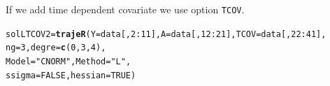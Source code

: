 \documentclass{article}\usepackage[]{graphicx}\usepackage[]{color}
\makeatletter
\newcommand{\hlnum}[1]{\textcolor[rgb]{0.686,0.059,0.569}{#1}}%
\newcommand{\hlstr}[1]{\textcolor[rgb]{0.192,0.494,0.8}{#1}}%
\newcommand{\hlopt}[1]{\textcolor[rgb]{0,0,0}{#1}}%
\newcommand{\hlstd}[1]{\textcolor[rgb]{0.345,0.345,0.345}{#1}}%
\newcommand{\hlkwb}[1]{\textcolor[rgb]{0.69,0.353,0.396}{#1}}%
\newcommand{\hlkwc}[1]{\textcolor[rgb]{0.333,0.667,0.333}{#1}}%
\newcommand{\hlkwd}[1]{\textcolor[rgb]{0.737,0.353,0.396}{\textbf{#1}}}%
\newenvironment{kframe}{%
 \def\at@end@of@kframe{}%
 \ifinner\ifhmode%
  \def\at@end@of@kframe{\end{minipage}}%
  \begin{minipage}{\columnwidth}%
 \fi\fi%
 \def\FrameCommand##1{\hskip\@totalleftmargin \hskip-\fboxsep
 \colorbox{shadecolor}{##1}\hskip-\fboxsep
     \hskip-\linewidth \hskip-\@totalleftmargin \hskip\columnwidth}%
 \MakeFramed {\advance\hsize-\width
   \@totalleftmargin\z@ \linewidth\hsize
   \@setminipage}}%
 {\par\unskip\endMakeFramed%
 \at@end@of@kframe}
\newenvironment{knitrout}{}{} %
\makeatother
\begin{document}
If we add time dependent covariate we use option \verb|TCOV|.
\begin{knitrout}
\color{fgcolor}\begin{kframe}
\begin{alltt}
\hlstd{solLTCOV2} \hlkwb{=} \hlkwd{trajeR}\hlstd{(}\hlkwc{Y} \hlstd{= data[,}\hlnum{2}\hlopt{:}\hlnum{11}\hlstd{],} \hlkwc{A} \hlstd{= data[,}\hlnum{12}\hlopt{:}\hlnum{21}\hlstd{],} \hlkwc{TCOV} \hlstd{= data[,}\hlnum{22}\hlopt{:}\hlnum{41}\hlstd{],}
                   \hlkwc{ng} \hlstd{=} \hlnum{3}\hlstd{,} \hlkwc{degre} \hlstd{=} \hlkwd{c}\hlstd{(}\hlnum{0}\hlstd{,}\hlnum{3}\hlstd{,}\hlnum{4}\hlstd{),}
                   \hlkwc{Model} \hlstd{=} \hlstr{"CNORM"}\hlstd{,} \hlkwc{Method} \hlstd{=} \hlstr{"L"}\hlstd{,}
                   \hlkwc{ssigma} \hlstd{=} \hlnum{FALSE}\hlstd{,} \hlkwc{hessian} \hlstd{=} \hlnum{TRUE}\hlstd{)}
\end{alltt}
\end{kframe}
\end{knitrout}
\end{document}
